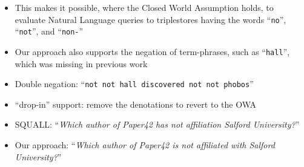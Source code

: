 \documentclass[logoontitle,tabu,supertabular,aspectratio=43]{preney-uwindsor-beamer}
\begin{document}
    \begin{frame}{\insertsection}
    \begin{itemize}
        \item This makes it possible, where the Closed World Assumption holds, to evaluate Natural Language queries to triplestores having the words ``\texttt{no}'', ``\texttt{not}'', and ``\texttt{non-}''
        \item Our approach also supports the negation of term-phrases, such as ``\texttt{hall}'', which was missing in previous work
        \item Double negation: ``\texttt{not not hall discovered not not phobos}''
        \item ``drop-in'' support: remove the denotations to revert to the OWA
        \item SQUALL\cite{ferre2013squall}: ``\textit{Which author of Paper42 has not affiliation Salford University?}''
        \item Our approach: ``\textit{Which author of Paper42 is not affiliated with Salford University?}''
    \end{itemize}
    \end{frame}
\end{document}

